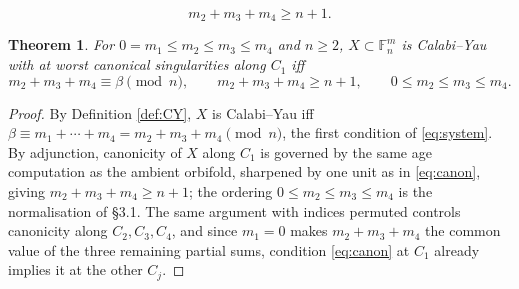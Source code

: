 \documentclass[10pt,a4paper]{amsart}
\newtheorem{theorem}{Theorem}
\begin{document}
	\begin{equation}\label{eq:canon}
		m_2+m_3+m_4\ge n+1.
	\end{equation}

	\begin{theorem}\label{thm:system}
		For $0=m_1\le m_2\le m_3\le m_4$ and $n\ge2$, $X\subset\mathbb{F}^m_n$ is Calabi--Yau with at worst canonical singularities along $C_1$ iff
		\begin{equation}\label{eq:system}
			m_2+m_3+m_4\equiv\beta\pmod n,\qquad m_2+m_3+m_4\ge n+1,\qquad 0\le m_2\le m_3\le m_4.
		\end{equation}
	\end{theorem}

	\begin{proof}
		By Definition \ref{def:CY}, $X$ is Calabi--Yau iff $\beta\equiv m_1+\cdots+m_4=m_2+m_3+m_4\pmod n$, the first condition of \eqref{eq:system}. By adjunction, canonicity of $X$ along $C_1$ is governed by the same age computation as the ambient orbifold, sharpened by one unit as in \eqref{eq:canon}, giving $m_2+m_3+m_4\ge n+1$; the ordering $0\le m_2\le m_3\le m_4$ is the normalisation of \S3.1. The same argument with indices permuted controls canonicity along $C_2,C_3,C_4$, and since $m_1=0$ makes $m_2+m_3+m_4$ the common value of the three remaining partial sums, condition \eqref{eq:canon} at $C_1$ already implies it at the other $C_j$.
	\end{proof}
\end{document}

